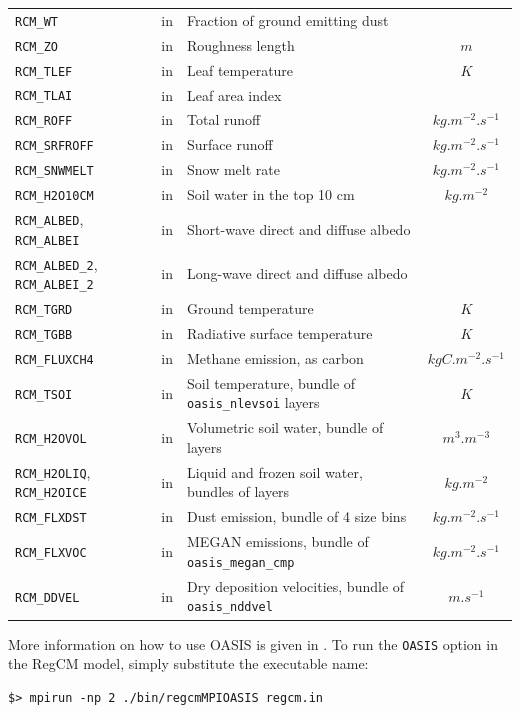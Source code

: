 {\begin{longtable}{p{4.5cm}|c|p{6.5cm}|c}
\verb=RCM_WT= & in & Fraction of ground emitting dust & \\
\verb=RCM_ZO= & in & Roughness length & $m$\\
\verb=RCM_TLEF= & in & Leaf temperature & $K$\\
\verb=RCM_TLAI= & in & Leaf area index & \\
\verb=RCM_ROFF= & in & Total runoff & $kg.m^{-2}.s^{-1}$\\
\verb=RCM_SRFROFF= & in & Surface runoff & $kg.m^{-2}.s^{-1}$\\
\verb=RCM_SNWMELT= & in & Snow melt rate & $kg.m^{-2}.s^{-1}$\\
\verb=RCM_H2O10CM= & in & Soil water in the top 10 cm & $kg.m^{-2}$\\
\verb=RCM_ALBED=, \verb=RCM_ALBEI= &
  in &
  Short-wave direct and diffuse albedo &
  \\
\verb=RCM_ALBED_2=, \verb=RCM_ALBEI_2= &
  in &
  Long-wave direct and diffuse albedo &
  \\
\verb=RCM_TGRD= & in & Ground temperature & $K$\\
\verb=RCM_TGBB= & in & Radiative surface temperature & $K$\\
\verb=RCM_FLUXCH4= & in & Methane emission, as carbon & $kgC.m^{-2}.s^{-1}$\\
\verb=RCM_TSOI= &
  in &
  Soil temperature, bundle of {\tt oasis\_nlevsoi} layers &
  $K$\\
\verb=RCM_H2OVOL= &
  in &
  Volumetric soil water, bundle of layers &
  $m^3.m^{-3}$\\
\verb=RCM_H2OLIQ=, \verb=RCM_H2OICE= &
  in &
  Liquid and frozen soil water, bundles of layers &
  $kg.m^{-2}$\\
\verb=RCM_FLXDST= &
  in &
  Dust emission, bundle of 4 size bins &
  $kg.m^{-2}.s^{-1}$\\
\verb=RCM_FLXVOC= &
  in &
  MEGAN emissions, bundle of {\tt oasis\_megan\_cmp} &
  $kg.m^{-2}.s^{-1}$\\
\verb=RCM_DDVEL= &
  in &
  Dry deposition velocities, bundle of {\tt oasis\_nddvel} &
  $m.s^{-1}$\\
\hline
\end{longtable}
}

More information on how to use OASIS is given in \cite{valcke_oasis}.
To run the \verb=OASIS= option in the RegCM model,
simply substitute the executable name:

\begin{Verbatim}
$> mpirun -np 2 ./bin/regcmMPIOASIS regcm.in
\end{Verbatim}

